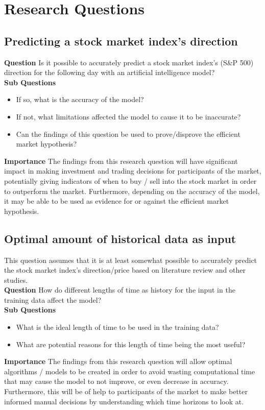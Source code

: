 \chapter{Research Questions} \label{chap:research-questions}


\section{Predicting a stock market index's direction}
\textbf{Question} Is it possible to accurately predict a stock market index's (S\&P 500) direction for
the following day with an artificial intelligence model?\\
\textbf{Sub Questions}
\begin{itemize}
    \item If so, what is the accuracy of the model?
    \item If not, what limitations affected the model to cause it to be inaccurate?
    \item Can the findings of this question be used to prove/disprove the efficient market hypothesis?
\end{itemize}
\textbf{Importance} The findings from this research question will have significant impact in making
investment and trading decisions for participants of the market, potentially giving indicators of
when to buy / sell into the stock market in order to outperform the market. Furthermore, depending
on the accuracy of the model, it may be able to be used as evidence for or against the efficient
market hypothesis.

\section{Optimal amount of historical data as input}
This question assumes that it is at least somewhat possible to accurately predict the stock market index's
direction/price based on literature review and other studies.\\
\textbf{Question} How do different lengths of time as history for the input in the training data affect the model?\\
\textbf{Sub Questions}
\begin{itemize}
    \item What is the ideal length of time to be used in the training data?
    \item What are potential reasons for this length of time being the most useful?
\end{itemize}
\textbf{Importance} The findings from this research question will allow optimal algorithms /
models to be created in order to avoid wasting computational time that may cause the model to 
not improve, or even decrease in accuracy. Furthermore, this will be of help to participants of
the market to make better informed manual decisions by understanding which time horizons to look
at.

